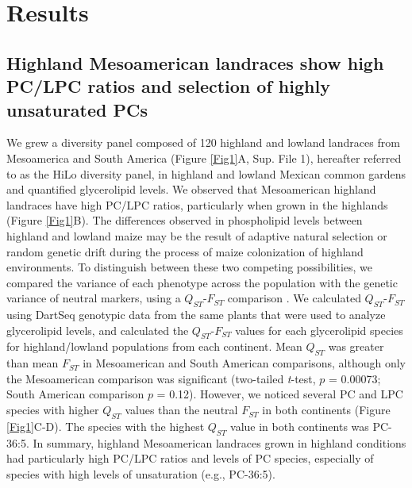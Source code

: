 \documentclass[9pt,twocolumn,twoside,lineno]{biorxiv}
\begin{document}
\section{Results}
\label{sec:results}
\subsection{Highland Mesoamerican landraces show high PC/LPC ratios and selection of highly unsaturated PCs}
We grew a diversity panel composed of 120 highland and lowland landraces from Mesoamerica and South America (Figure \ref{Fig1}A, Sup. File 1), hereafter referred to as the HiLo diversity panel, in highland and lowland Mexican common gardens and quantified glycerolipid levels.    
We observed that Mesoamerican highland landraces have  high PC/LPC ratios,  particularly when grown in the highlands (Figure \ref{Fig1}B).
The differences observed in phospholipid levels between highland and lowland maize may be the result of adaptive natural selection or random genetic drift during the process of maize colonization of highland environments.
To distinguish between these two competing possibilities, we compared the variance of each phenotype across the population with the genetic variance of neutral markers, using a $Q_{ST}$-$F_{ST}$ comparison \cite{Leinonen2013-ic}.
We calculated $Q_{ST}$-$F_{ST}$ using DartSeq genotypic data from the same plants that were used to analyze glycerolipid levels, and calculated the $Q_{ST}$-$F_{ST}$ values for each glycerolipid species for highland/lowland populations from each continent. 
Mean $Q_{ST}$ was greater than mean $F_{ST}$ in Mesoamerican and South American comparisons, although only the Mesoamerican comparison was significant (two-tailed \textit{t}-test, $p$ = 0.00073; South American comparison $p$ = 0.12).
However, we noticed several PC and LPC species with higher $Q_{ST}$ values than the neutral $F_{ST}$ in both continents (Figure \ref{Fig1}C-D).
The species with the highest $Q_{ST}$ value in both continents was PC-36:5. 
In summary, highland Mesoamerican landraces grown in highland conditions had particularly high PC/LPC ratios and levels of PC species, especially of species with high levels of unsaturation (e.g., PC-36:5). 
\end{document}

